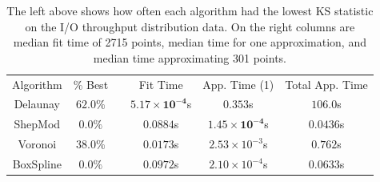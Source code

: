 \documentclass[smallextended,final]{svjour3}       %
\begin{document}
\begin{appendix}
\begin{table}
  \centering
  \begin{tabular}{|c|c| c |c|c|c|}
    \cline{1-2}\cline{4-6}
    Algorithm & \% Best &  & Fit Time & App. Time (1) & Total App. Time\\
    \cline{1-2}\cline{4-6}
    Delaunay & $\mathbf{62.0}\%$ &  & $\mathbf{5.17 \times 10^{-4}}$s & $0.353$s & $106.0$s\\
    ShepMod & $0.0\%$ &  & $0.0884$s & $\mathbf{1.45 \times 10^{-4}}$s & $\mathbf{0.0436}$s\\
    Voronoi & $\mathit{38.0}\%$ &  & $\mathit{0.0173}$s & $2.53 \times 10^{-3}$s & $0.762$s\\
    BoxSpline & $0.0\%$ &  & $0.0972$s & $\mathit{2.10 \times 10^{-4}}$s & $\mathit{0.0633}$s\\
    \cline{1-2}\cline{4-6}
  \end{tabular}
  \caption{The left above shows how often each algorithm had the lowest KS statistic on the I/O throughput distribution data. On the right columns are median fit time of 2715 points, median time for one approximation, and median time approximating 301 points.}
  \label{table:best-throughput}
\end{table}


\end{appendix}
\end{document}

